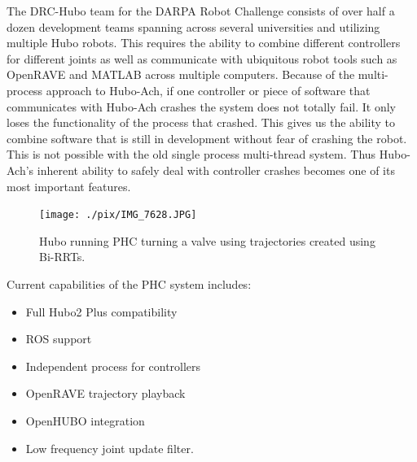 The DRC-Hubo team for the DARPA Robot Challenge consists of over half a dozen development teams spanning across several universities and utilizing multiple Hubo robots.  
This requires the ability to combine different controllers for different joints as well as communicate with ubiquitous robot tools such as OpenRAVE and MATLAB across multiple computers.
Because of the multi-process approach to Hubo-Ach, if one controller or piece of software that communicates with Hubo-Ach crashes the system does not totally fail. 
It only loses the functionality of the process that crashed.
This gives us the ability to combine software that is still in development without fear of crashing the robot.
This is not possible with the old single process multi-thread system.
Thus Hubo-Ach's inherent ability to safely deal with controller crashes becomes one of its most important features.





\begin{figure}[thpb]
  \centering
\texttt{[image: ./pix/IMG\_7628.JPG]}
  \caption{Hubo running PHC turning a valve using trajectories created using Bi-RRTs. }
  \label{fig:valve}
\end{figure}

Current capabilities of the PHC system includes:

\begin{itemize}
\item Full Hubo2 Plus compatibility 
\item ROS support
\item Independent process for controllers
\item OpenRAVE trajectory playback
\item OpenHUBO integration 
\item Low frequency joint update filter.
\end{itemize}




